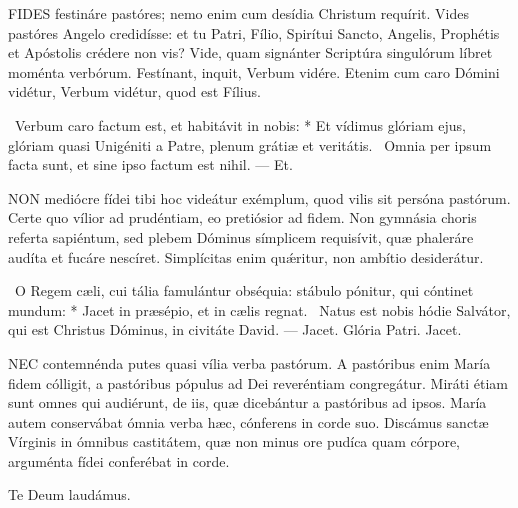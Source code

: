 

\lettrine[lines=2]{F}{IDES} festináre pastóres; nemo enim cum desídia Christum requírit. Vides pastóres Angelo credidísse: et tu Patri, Fílio, Spirítui Sancto, Angelis, Prophétis et Apóstolis crédere non vis? Vide, quam signánter Scriptúra singulórum líbret moménta verbórum. Festínant, inquit, Verbum vidére. Etenim cum caro Dómini vidétur, Verbum vidétur, quod est Fílius.

\R\ Verbum caro factum est, et habitávit in nobis: * Et vídimus glóriam ejus, glóriam quasi Unigéniti a Patre, plenum grátiæ et veritátis. \V\ Omnia per ipsum facta sunt, et sine ipso factum est nihil. --- Et.


\lettrine[lines=2]{N}{ON} mediócre fídei tibi hoc videátur exémplum, quod vilis sit persóna pastórum. Certe quo vílior ad prudéntiam, eo pretiósior ad fidem. Non gymnásia choris referta sapiéntum, sed plebem Dóminus símplicem requisívit, quæ phaleráre audíta et fucáre nescíret. Simplícitas enim quǽritur, non ambítio desiderátur.

\R\ O Regem cæli, cui tália famulántur obséquia: stábulo pónitur, qui cóntinet mundum: * Jacet in præsépio, et in cælis regnat. \V\ Natus est nobis hódie Salvátor, qui est Christus Dóminus, in civitáte David. --- Jacet. Glória Patri. Jacet.


\lettrine[lines=2]{N}{EC} contemnénda putes quasi vília verba pastórum. A pastóribus enim María fidem cólligit, a pastóribus pópulus ad Dei reveréntiam congregátur. Miráti étiam sunt omnes qui audiérunt, de iis, quæ dicebántur a pastóribus ad ipsos. María autem conservábat ómnia verba hæc, cónferens in corde suo. Discámus sanctæ Vírginis in ómnibus castitátem, quæ non minus ore pudíca quam córpore, arguménta fídei conferébat in corde.

 Te Deum laudámus.


\sectionornament





